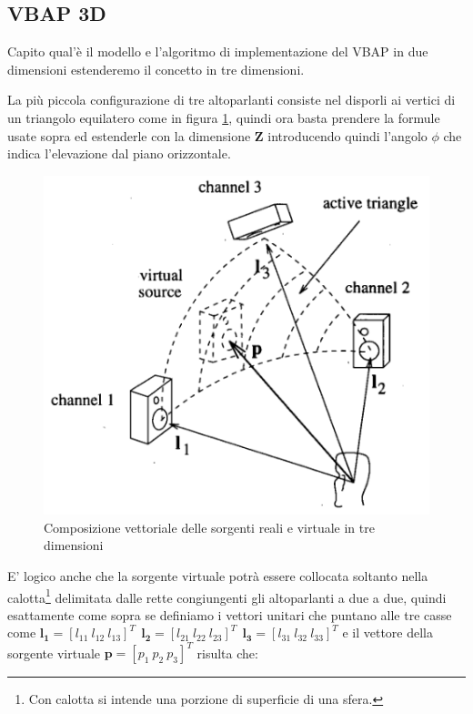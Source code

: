 \documentclass[12pt,a4paper]{report}
\begin{document}
\begin{itemize}
\subsection{VBAP 3D}

Capito qual'è il modello e l'algoritmo di implementazione del VBAP in due dimensioni estenderemo il concetto in tre dimensioni.

La più piccola configurazione di tre altoparlanti consiste nel disporli ai vertici di un triangolo equilatero come in figura \ref{fig:triangolo}, quindi ora basta prendere la formule usate sopra ed estenderle con la dimensione $\boldsymbol{Z}$ introducendo quindi l'angolo $\phi$ che indica l'elevazione dal piano orizzontale.

\begin{figure}[htbp]
	\centering
	\includegraphics[scale=0.50]{figures/matrix3d.png}
	\caption {Composizione vettoriale delle sorgenti reali e virtuale in tre dimensioni}
	\label{fig:triangolo}
	\end{figure}

E' logico anche che la sorgente virtuale potrà essere collocata soltanto nella calotta\footnote{Con calotta si intende una porzione di superficie di una sfera.} delimitata dalle rette congiungenti gli altoparlanti a due a due,	 quindi esattamente come sopra se definiamo i vettori unitari che puntano alle tre casse come $ \boldsymbol{l_{1}}= {\left[ l_{11} \ l_{12} \ l_{13} \right]}^T \ \ \boldsymbol{l_{2}}= {\left[ l_{21} \ l_{22} \ l_{23} \right]}^T \ \ \boldsymbol{l_{3}}= {\left[ l_{31} \ l_{32} \ l_{33} \right]}^T$ e il vettore della sorgente virtuale $\boldsymbol{p}= {\left[ p_{1} \ p_{2} \ p_{3} \right]}^T$ risulta che:


\end{itemize}
\end{document}
